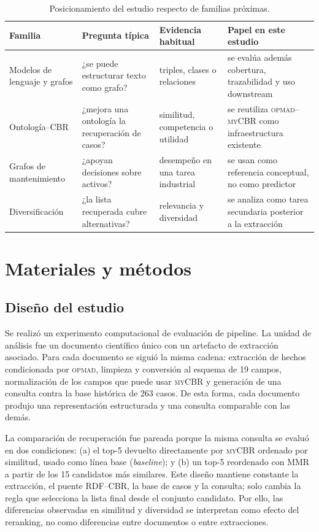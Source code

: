 \documentclass[11pt,a4paper]{article}
\newcommand{\OPMAD}{\textsc{opmad}}
\newcommand{\myCBR}{\textsc{myCBR}}
\begin{document}
\begin{table}[H]
\centering
\caption{Posicionamiento del estudio respecto de familias próximas.}
\label{tab:positioning}
\footnotesize
\begin{tabularx}{\linewidth}{lXXX}
\toprule
Familia & Pregunta típica & Evidencia habitual & Papel en este estudio \\
\midrule
Modelos de lenguaje y grafos & ¿se puede estructurar texto como grafo? & triples, clases o relaciones & se evalúa además cobertura, trazabilidad y uso downstream \\
Ontología--CBR & ¿mejora una ontología la recuperación de casos? & similitud, competencia o utilidad & se reutiliza \OPMAD{}--\myCBR{} como infraestructura existente \\
Grafos de mantenimiento & ¿apoyan decisiones sobre activos? & desempeño en una tarea industrial & se usan como referencia conceptual, no como predictor \\
Diversificación & ¿la lista recuperada cubre alternativas? & relevancia y diversidad & se analiza como tarea secundaria posterior a la extracción \\
\bottomrule
\end{tabularx}
\end{table}

\section{Materiales y métodos}
\label{sec:methods}

\subsection{Diseño del estudio}

Se realizó un experimento computacional de evaluación de pipeline. La unidad de análisis fue un documento científico único con un artefacto de extracción asociado. Para cada documento se siguió la misma cadena: extracción de hechos condicionada por \OPMAD{}, limpieza y conversión al esquema de 19 campos, normalización de los campos que puede usar \myCBR{} y generación de una consulta contra la base histórica de 263 casos. De esta forma, cada documento produjo una representación estructurada y una consulta comparable con las demás.

La comparación de recuperación fue pareada porque la misma consulta se evaluó en dos condiciones: (a) el top-5 devuelto directamente por \myCBR{} ordenado por similitud, usado como línea base (\emph{baseline}); y (b) un top-5 reordenado con MMR a partir de los 15 candidatos más similares. Este diseño mantiene constante la extracción, el puente RDF--CBR, la base de casos y la consulta; solo cambia la regla que selecciona la lista final desde el conjunto candidato. Por ello, las diferencias observadas en similitud y diversidad se interpretan como efecto del reranking, no como diferencias entre documentos o entre extracciones.
\end{document}
